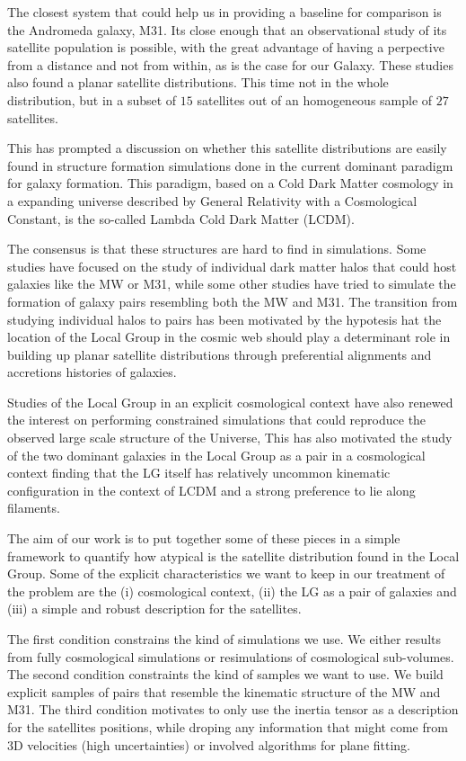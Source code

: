 \documentclass[a4paper,fleqn,usenatbib]{mnras}
\begin{document}
The closest system that could help us in providing a baseline for
comparison is the Andromeda galaxy, M31. 
Its close enough that an observational study of its satellite
population is possible, with the great advantage of having a
perpective from a distance and not from within, as is the case for our
Galaxy. 
These studies also found a planar satellite
distributions.
This time not in the whole distribution, but in a subset of $15$
satellites out of an homogeneous sample of $27$ satellites. 


This has prompted a discussion on whether this satellite distributions
are easily found in structure formation simulations done in the
current dominant paradigm for galaxy formation.
This paradigm, based on a Cold Dark Matter cosmology in
a expanding universe described by General Relativity with a
Cosmological Constant, is the so-called Lambda Cold Dark Matter
(LCDM).

The consensus is that these structures are hard to find in
simulations. 
Some studies have focused on the study of individual dark matter halos
that could host galaxies like the MW or M31, while some other studies
have tried to simulate the formation of galaxy pairs resembling both
the MW and M31.
The transition from studying individual halos to pairs has been
motivated by the hypotesis hat the location of the Local Group in
the cosmic web should play a determinant role in building up planar
satellite distributions through preferential alignments and accretions
histories of galaxies.

Studies of the Local Group in an explicit cosmological context have
also renewed the interest on performing constrained simulations that
could reproduce the observed large scale structure of the Universe,
This has also motivated the study of the two dominant galaxies in the 
Local Group as a pair in a cosmological context finding that the LG
itself has relatively uncommon kinematic configuration in the context
of LCDM and a strong preference to lie along filaments.


The aim of our work is to put together some of these pieces in a 
simple framework to quantify how atypical is the satellite
distribution found in the Local Group.
Some of the explicit characteristics we want to keep in our treatment
of the problem are the (i) cosmological context, (ii) the LG as a pair
of galaxies and (iii) a simple and robust description for the
satellites. 

The first condition constrains the kind of simulations we use. 
We either results from fully cosmological simulations or resimulations
of cosmological sub-volumes. 
The second condition constraints the kind of samples we want to
use. We build explicit samples of pairs that resemble the kinematic
structure of the MW and M31. 
The third condition motivates to only use the inertia tensor as a
description for the satellites positions, while droping any
information that might come from 3D velocities (high uncertainties) or
involved algorithms for plane fitting.  
\end{document}
